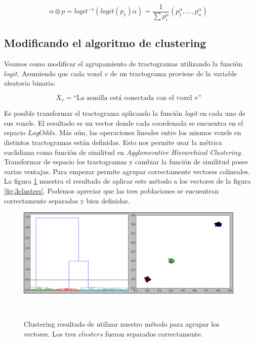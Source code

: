 $$ \alpha \otimes p = logit^{-1} ( logit(p_1) \alpha ) = 
   \frac{1}{\sum p_{i}^{\alpha}}(p_1^{\alpha}, \dots, p_n^{\alpha})  $$

\subsection{Modificando el algoritmo de clustering}
\label{sec:modificandoClustering}

Veamos como modificar el agrupamiento de tractogramas utilizando la
funci\'on $logit$. Asumiendo que cada voxel $v$ de un tractograma proviene 
de la variable aleatoria binaria:

$$X_v= \textrm{``La semilla est\'a conectada con el voxel v''}$$
 
Es posible transformar el tractograma aplicando la funci\'on 
\textit{logit} en cada uno de sus voxels. El resultado es un vector donde
cada coordenada se encuentra en el espacio $LogOdds$. M\'as a\'un, las
operaciones lineales entre los mismos voxels en distintos tractogramas 
est\'an definidas. Esto nos permite usar la m\'etrica euclidiana como
funci\'on de similitud en \textit{Agglomerative Hierarchical Clustering}.\\

Transformar de espacio los tractogramas y cambiar la funci\'on de
similitud posee varias ventajas. Para empezar permite agrupar
correctamente vectores colineales. La figura \ref{fig:3logit} muestra el
resultado de aplicar este m\'etodo a los vectores de la figura
\ref{fig:3clusters}. Podemos apreciar que las tres poblaciones se
encuentran correctamente separadas y bien definidas.\\

\begin{figure}[h!]

\centering
\begin{minipage}[b]{0.85\textwidth}
    \includegraphics[width=\textwidth]{img/3pop_logit.png}
    
    \caption{Clustering resultado de utilizar nuestro m\'etodo para 
             agrupar los vectores. Los tres $clusters$ fueron separados
             correctamente.}
    \label{fig:3logit}
\end{minipage} ~

\end{figure}  

